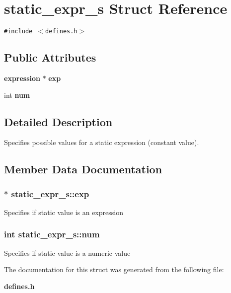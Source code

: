 \section{static\_\-expr\_\-s Struct Reference}
\label{structstatic__expr__s}
{\tt \#include $<$defines.h$>$}

\subsection*{Public Attributes}
\begin{CompactItemize}
\item 
{\bf expression} $\ast$ {\bf exp}
\item 
int {\bf num}
\end{CompactItemize}


\subsection{Detailed Description}
Specifies possible values for a static expression (constant value). 



\subsection{Member Data Documentation}
\subsubsection{$\ast$ static\_\-expr\_\-s::exp}\label{structstatic__expr__s_m0}


Specifies if static value is an expression 
\subsubsection{\setlength{\rightskip}{0pt plus 5cm}int static\_\-expr\_\-s::num}\label{structstatic__expr__s_m1}


Specifies if static value is a numeric value 

The documentation for this struct was generated from the following file:\begin{CompactItemize}
\item 
{\bf defines.h}\end{CompactItemize}
